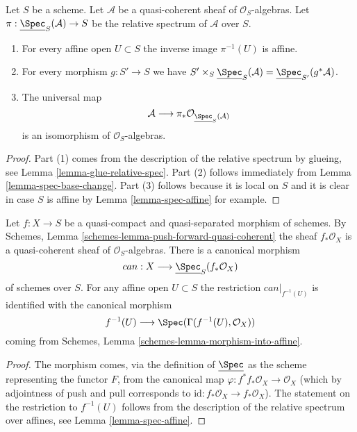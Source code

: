 \begin{lemma}
\label{lemma-spec-properties}
Let $S$ be a scheme. Let $\mathcal{A}$ be a quasi-coherent
sheaf of $\mathcal{O}_S$-algebras. Let
$\pi : \underline{\Spec}_S(\mathcal{A}) \to S$
be the relative spectrum of $\mathcal{A}$ over $S$.
\begin{enumerate}
\item For every affine open $U \subset S$ the inverse image
$\pi^{-1}(U)$ is affine.
\item For every morphism $g : S' \to S$ we have
$S' \times_S \underline{\Spec}_S(\mathcal{A}) =
\underline{\Spec}_{S'}(g^*\mathcal{A})$.
\item
The universal map
$$
\mathcal{A}
\longrightarrow
\pi_*\mathcal{O}_{\underline{\Spec}_S(\mathcal{A})}
$$
is an isomorphism of $\mathcal{O}_S$-algebras.
\end{enumerate}
\end{lemma}

\begin{proof}
Part (1) comes from the description of the relative spectrum
by glueing, see Lemma \ref{lemma-glue-relative-spec}.
Part (2) follows immediately from Lemma \ref{lemma-spec-base-change}.
Part (3) follows because it is local on $S$ and it is clear in case $S$
is affine by Lemma \ref{lemma-spec-affine} for example.
\end{proof}

\begin{lemma}
\label{lemma-canonical-morphism}
Let $f : X \to S$ be a quasi-compact and quasi-separated morphism
of schemes. By Schemes, Lemma \ref{schemes-lemma-push-forward-quasi-coherent}
the sheaf $f_*\mathcal{O}_X$ is a quasi-coherent sheaf of
$\mathcal{O}_S$-algebras. There is a canonical morphism
$$
can : X \longrightarrow \underline{\Spec}_S(f_*\mathcal{O}_X)
$$
of schemes over $S$.
For any affine open $U \subset S$ the restriction $can|_{f^{-1}(U)}$
is identified with the canonical morphism
$$
f^{-1}(U) \longrightarrow \Spec(\Gamma(f^{-1}(U), \mathcal{O}_X))
$$
coming from Schemes, Lemma \ref{schemes-lemma-morphism-into-affine}.
\end{lemma}

\begin{proof}
The morphism comes, via the definition of $\underline{\Spec}$
as the scheme representing the functor $F$, from the canonical map
$\varphi : f^*f_*\mathcal{O}_X \to \mathcal{O}_X$ (which by adjointness of
push and pull corresponds to
$\text{id} : f_*\mathcal{O}_X \to f_*\mathcal{O}_X$).
The statement on the restriction to $f^{-1}(U)$
follows from the description of the relative spectrum over
affines, see Lemma \ref{lemma-spec-affine}.
\end{proof}











